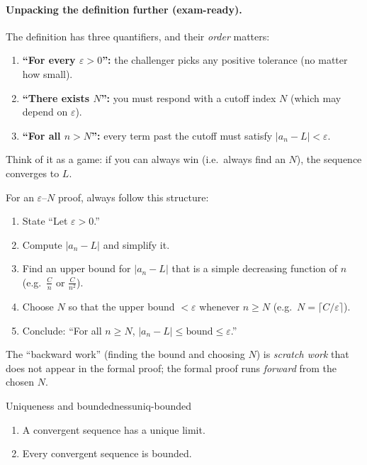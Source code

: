 \paragraph{Unpacking the definition further (exam-ready).}
The definition has three quantifiers, and their \emph{order} matters:
\begin{enumerate}[leftmargin=3em]
\item \textbf{``For every $\varepsilon>0$'':} the challenger picks any positive tolerance (no matter how small).
\item \textbf{``There exists $N$'':} you must respond with a cutoff index $N$ (which may depend on $\varepsilon$).
\item \textbf{``For all $n>N$'':} every term past the cutoff must satisfy $|a_n-L|<\varepsilon$.
\end{enumerate}
Think of it as a game: if you can always win (i.e.\ always find an $N$), the sequence converges to $L$.

\begin{examtip}[title={Exam Focus: The $\varepsilon$--$N$ proof template}]

For an $\varepsilon$--$N$ proof, always follow this structure:

\begin{enumerate}[leftmargin=3em]
\item State ``Let $\varepsilon>0$.''
\item Compute $|a_n-L|$ and simplify it.
\item Find an upper bound for $|a_n-L|$ that is a simple decreasing function of $n$ (e.g.\ $\frac{C}{n}$ or $\frac{C}{n^2}$).
\item Choose $N$ so that the upper bound $<\varepsilon$ whenever $n\ge N$ (e.g.\ $N=\lceil C/\varepsilon\rceil$).
\item Conclude: ``For all $n\ge N$, $|a_n-L|\le \text{bound}\le \varepsilon$.''
\end{enumerate}

The ``backward work'' (finding the bound and choosing $N$) is \emph{scratch work} that does not appear in the formal proof; the formal proof runs \emph{forward} from the chosen $N$.

\end{examtip}


\begin{theorem}{Uniqueness and boundedness}{uniq-bounded}
\begin{enumerate}[label=(\roman*), leftmargin=3em]
\item A convergent sequence has a unique limit.

\item Every convergent sequence is bounded.

\end{enumerate}

\end{theorem}


